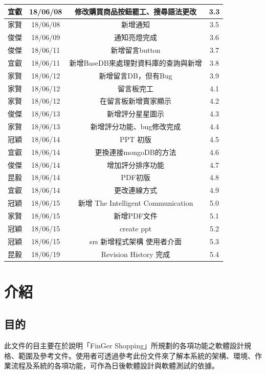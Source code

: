 \documentclass{scrreprt}
\begin{document}
\begin{CJK}{UTF8}{bkai}
\begin{center}
\begin{longtable}{|c|c|c|c|}
        \hline
	    宜叡 & 18/06/08 & 修改購買商品按鈕罷工、搜尋語法更改 & 3.3\\
        \hline
	    家賢 & 18/06/08 & 新增通知 & 3.5\\
        \hline
	    俊傑 & 18/06/09 & 通知亮燈完成 & 3.6\\
        \hline
	    俊傑 & 18/06/11 & 新增留言button & 3.7\\
        \hline
	    宜叡 & 18/06/11 & 新增BaseDB來處理對資料庫的查詢與新增 & 3.8\\
        \hline
	    家賢 & 18/06/12 & 新增留言DB，但有Bug & 3.9\\
        \hline
	    家賢 & 18/06/12 & 留言板完工 & 4.1\\
        \hline
	    家賢 & 18/06/12 & 在留言板新增賣家顯示 & 4.2\\
        \hline
	    俊傑 & 18/06/13 & 新增評分星星圖示 & 4.3\\
        \hline
	    家賢 & 18/06/13 & 新增評分功能、bug修改完成 & 4.4\\
      \hline
	    冠穎 & 18/06/14 & PPT 初版 & 4.5\\
      \hline
	    宜叡 & 18/06/14 & 更換連接mongoDB的方法 & 4.6\\
      \hline
	    俊傑 & 18/06/14 & 增加評分排序功能 & 4.7\\
      \hline
	    昆毅 & 18/06/14 & PDF初版 & 4.8\\
      \hline
	    宜叡 & 18/06/14 & 更改連線方式 & 4.9\\
      \hline
	    冠穎 & 18/06/15 & 新增 The Intelligent Communication & 5.0\\
      \hline
	    家賢 & 18/06/15 & 新增PDF文件 & 5.1\\
      \hline
	    冠穎 & 18/06/15 & create ppt & 5.2\\
      \hline
	    冠穎 & 18/06/15 & srs 新增程式架構 使用者介面 & 5.3\\
      \hline
	    昆毅 & 18/06/19 & Revision History 完成 & 5.4\\
        \hline
    \end{longtable}
\end{center}

\chapter{介紹}

\section{目的}
\qquad 此文件的目主要在於說明「FinGer Shopping」所規劃的各項功能之軟體設計規格、範圍及參考文件。使用者可透過參考此份文件來了解本系統的架構、環境、作業流程及系統的各項功能，可作為日後軟體設計與軟體測試的依據。


\end{CJK}
\end{document}
